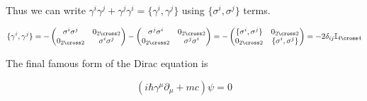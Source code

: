Thus we can write $\gamma^{i} \gamma^{j} + \gamma^{j} \gamma^{i} = \{\gamma^{i}, \gamma^{j}\}$ using $\{\sigma^{i}, \sigma^{j}\}$ terms.

\begin{equation*}
    \begin{gathered}
        \{\gamma^{i}, \gamma^{j}\} = - 
        \begin{pmatrix}
             \sigma^{i} \sigma^{j} & 0_{2 \cross 2} \\
             0_{2 \cross 2} & \sigma^{i} \sigma^{j}
        \end{pmatrix} - 
        \begin{pmatrix}
             \sigma^{j} \sigma^{i} & 0_{2 \cross 2} \\
             0_{2 \cross 2} & \sigma^{j} \sigma^{i}
        \end{pmatrix} = 
        - \begin{pmatrix}
            \{\sigma^{i}, \sigma^{j}\} & 0_{2 \cross 2} \\
             0_{2 \cross 2} & \{\sigma^{i},  \sigma^{j}\}
        \end{pmatrix} = - 2 \delta_{ij} \mathbb{I}_{4 \cross 4}
    \end{gathered}
\end{equation*}

The final famous form of the Dirac equation is

\begin{equation}
    \label{eq:dirac_original}
    ( i \hbar \gamma^{\mu} \partial_{\mu} + mc) \psi = 0
\end{equation}
